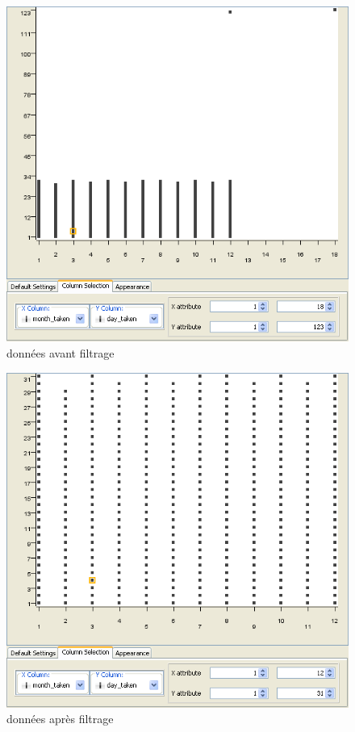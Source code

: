         \begin{figure}[h]
            \centering
            \includegraphics[scale=0.35]{../screenshots/month_day_before.png}
            \caption{données avant filtrage}
            \label{diagram:month_day_before}
        \end{figure}

        \begin{figure}[h]
            \centering
            \includegraphics[scale=0.35]{../screenshots/month_day_after.png}
            \caption{données apr\`es filtrage}
            \label{diagram:month_day_after}
        \end{figure}

